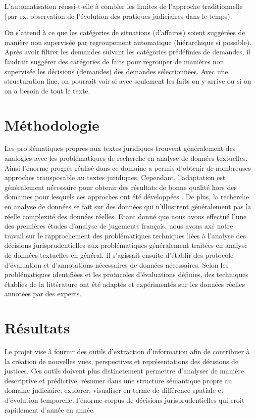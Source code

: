 L'automatisation réussi-t-elle à combler les limites de l'approche traditionnelle (par ex. observation de l'évolution des pratiques judiciaires dans le temps).

On s'attend à ce que les catégories de situations (d'affaires) soient suggérées de manière non supervisée par regroupement automatique (hiérarchique si possible). Après avoir filtrer les demandes suivant les catégories prédéfinies de demandes, il faudrait suggérer des catégories de faits pour regrouper de manières non supervisée les décisions (demandes) des demandes sélectionnées. Avec une structuration fine, on pourrait voir si avec seulement les faits on y arrive ou si on on a besoin de tout le texte.


\section{Méthodologie}
\label{sec:intro:methodologie}


Les problématiques propres aux textes juridiques trouvent généralement des analogies avec les problématiques de recherche en analyse de données textuelles. Ainsi l'énorme progrès réalisé dans ce domaine a permis d'obtenir de nombreuses approches transposable au textes juridiques. Cependant, l'adaptation est généralement nécessaire pour obtenir des résultats de bonne qualité hors des domaines pour lesquels ces approches ont été développées \citep{Waltl2016lexia}. De plus, la recherche en analyse de données se fait sur des données qui n'illustrent généralement pas la réelle complexité des données réelles. Etant donné que nous avons effectué l'une des premières études d'analyse de jugements français, nous avons axé notre travail sur le rapprochement des problématiques techniques liées à l'analyse des décisions jurisprudentielles aux problématiques généralement traitées en analyse de données textuelles en général. Il s'agissait ensuite d'établir des protocole d'évaluation et d'annotations nécessaires de données nécessaires. Selon les problématiques identifiées et les protocoles d'évaluations définies, des techniques établies de la littérature ont été adaptés et expérimentés sur les données réelles annotées par des experts.

\section{Résultats}
\label{sec:intro:résultats}
Le projet vise à fournir des outils d'extraction d'information afin de contribuer à la création de nouvelles vues, perspectives et représentations des décisions de justices. Ces outils doivent plus distinctement permettre d'analyser de manière descriptive et prédictive, résumer dans une structure sémantique propre au domaine judiciaire, explorer, visualiser en terme de différence spatiale et d'évolution temporelle, l'énorme corpus de décisions jurisprudentielles qui croit rapidement d'année en année.

